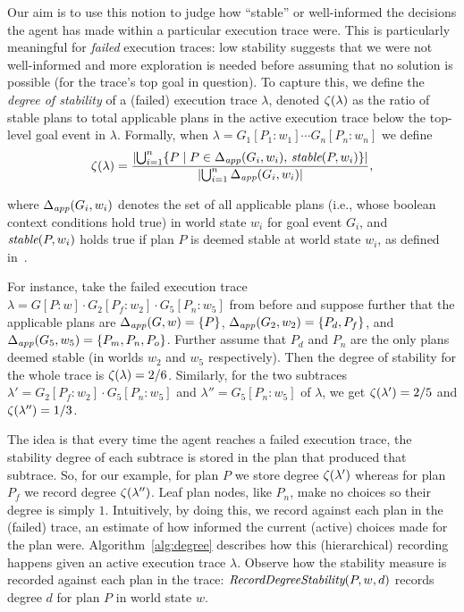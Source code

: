 Our aim is to use this notion to judge how ``stable'' or well-informed the decisions the agent has made within a particular execution trace were. This is particularly meaningful for \emph{failed} execution traces: low stability suggests that we were not well-informed and more exploration is needed before assuming that no solution is possible (for the trace's top goal in question).
To capture this, we define the \emph{degree of stability} of a (failed) execution trace $\lambda$, denoted $\zeta(\lambda)$ as the ratio of stable plans to total applicable plans in the active execution trace below the top-level goal event in $\lambda$. Formally, when $\lambda= G_1[P_1:w_1] \cdots G_n[P_n:w_n]$ we define 
\[
\zeta(\lambda) = 
	\frac{ 
			|{ \bigcup_{i=1}^n \{P \mid P \in \Delta_{\operatorname{\textit{app}}}(G_i,w_i),\, \operatorname{\textit{stable}}(P,w_i)\} }| 
		}
		{
			|{	\bigcup_{i=1}^n \Delta_{\operatorname{\textit{app}}}(G_i,w_i) }| 
		},
\]

\noindent
where  $\Delta_{\operatorname{\textit{app}}}(G_i,w_i)$ denotes the set of all applicable plans (i.e., whose boolean context conditions hold true) in world state $w_i$ for goal event $G_i$, and $\operatorname{\textit{stable}}(P,w_i)$ holds true if plan $P$ is deemed stable at world state $w_i$, as defined in~\cite{singh10:learning}.

For instance, take the failed execution trace $\lambda = G[P:w] \cdot G_2[P_f:w_2] \cdot G_5[P_n:w_5]$ from before and suppose further that the applicable plans are $\Delta_{\operatorname{\textit{app}}}(G,w) = \{P\}$, $\Delta_{\operatorname{\textit{app}}}(G_2,w_2) = \{P_d,P_f\}$, and $\Delta_{\operatorname{\textit{app}}}(G_5,w_5) = \{P_m,P_n,P_o\}$. Further assume that $P_d$ and $P_n$ are the only plans deemed stable (in worlds $w_2$ and $w_5$ respectively). 
Then the degree of stability for the whole trace is $\zeta(\lambda)= 2/6$.
Similarly, for the two subtraces $\lambda'= G_2[P_f:w_2] \cdot G_5[P_n:w_5]$ and $\lambda'' =G_5[P_n:w_5]$ of $\lambda$, we get $\zeta(\lambda') = 2/5$ and $\zeta(\lambda'') = 1/3$.



\newcommand{\StablePlan}{\mathname{StablePlan}}
\newcommand{\SetDegreeStability}{\mathname{RecordDegreeStability}}
\newcommand{\UpdateDegreeStability}{\mathname{RecordDegreeStabilityInTrace}}

The idea is that every time the agent reaches a failed execution trace, the stability degree of each subtrace is stored in the plan that produced that subtrace.
So, for our example, for plan $P$ we store degree $\zeta(\lambda')$ whereas for plan $P_f$ we record degree $\zeta(\lambda'')$. Leaf plan nodes, like $P_n$, make no choices so their degree is simply $1$.
Intuitively, by doing this, we record against each plan in the (failed) trace, an estimate of how informed the current (active) choices made for the plan were.  
Algorithm~\ref{alg:degree} describes how this (hierarchical) recording happens given an active execution trace $\lambda$. Observe how the stability measure is recorded against each plan in the trace: $\SetDegreeStability(P, w, d)$ records degree $d$ for plan $P$ in world state $w$.

